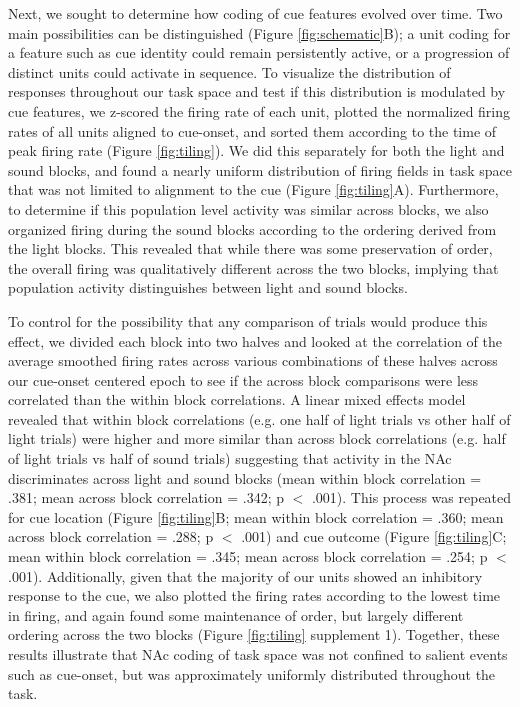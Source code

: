 \documentclass[11pt]{article}
\begin{document}
Next, we sought to determine how coding of cue features evolved over
time. Two main possibilities can be distinguished (Figure \ref{fig:schematic}B);
a unit coding for a feature such as cue identity could remain
persistently active, or a progression of distinct units could activate
in sequence. To visualize the distribution of responses throughout our
task space and test if this distribution is modulated by cue features,
we z-scored the firing rate of each unit, plotted the normalized
firing rates of all units aligned to cue-onset, and sorted them
according to the time of peak firing rate (Figure
\ref{fig:tiling}). We did this separately for both the light and sound
blocks, and found a nearly uniform distribution of firing fields in
task space that was not limited to alignment to the cue (Figure
\ref{fig:tiling}A). Furthermore, to determine if this population level
activity was similar across blocks, we also organized firing during
the sound blocks according to the ordering derived from the light
blocks. This revealed that while there was some preservation of order,
the overall firing was qualitatively different across the two blocks,
implying that population activity distinguishes between light and
sound blocks. 

To control for the possibility that any comparison of
trials would produce this effect, we divided each
block into two halves and looked at the correlation of the average
smoothed firing rates across various combinations of these halves
across our cue-onset centered epoch to see if the across block comparisons were less correlated than the within block correlations. A linear mixed effects model
revealed that within block correlations (e.g. one half of light trials
vs other half of light trials) were higher and more similar than
across block correlations (e.g. half of light trials vs half of sound
trials) suggesting that activity in the NAc discriminates across
light and sound blocks (mean within block correlation = .381; mean across block correlation = .342; p $<$ .001). This process was repeated for cue location (Figure \ref{fig:tiling}B; mean within block correlation = .360; mean across block correlation =
.288; p $<$ .001) and cue outcome (Figure \ref{fig:tiling}C; mean within block correlation =
.345; mean across block correlation = .254; p $<$ .001). Additionally, given that the majority of our units showed an inhibitory response to the cue, we
also plotted the firing rates according to the lowest time in firing,
and again found some maintenance of order, but largely different
ordering across the two blocks (Figure \ref{fig:tiling} supplement 1). Together, these results illustrate that NAc coding of task space was not confined to salient events such as cue-onset, but was approximately uniformly distributed throughout the task.
\end{document}
